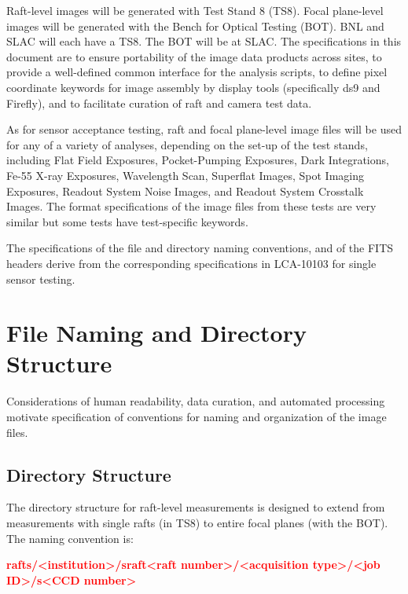 \documentclass{article}[12pt]
\newcommand{\red}{\textcolor{red}}
\begin{document}
Raft-level images will be generated with Test Stand 8 (TS8).  Focal plane-level images will be generated with the Bench for Optical Testing (BOT).  BNL and SLAC will each have a TS8.  The BOT will be at SLAC.  The specifications in this document are to ensure portability of the image data products across sites, to provide a well-defined common interface for the analysis scripts, to define pixel coordinate keywords for image assembly by display tools (specifically ds9 and Firefly), and to facilitate curation of raft and camera test data.

As for sensor acceptance testing, raft and focal plane-level image files will be used for any of a variety of analyses, depending on the set-up of the test stands, including Flat Field Exposures, Pocket-Pumping Exposures, Dark Integrations, Fe-55 X-ray Exposures, Wavelength Scan, Superflat Images, Spot Imaging Exposures, Readout System Noise Images, and Readout System Crosstalk Images.
The format specifications of the image files from these tests are very similar but some tests have test-specific keywords.  

The specifications of the file and directory naming conventions, and of the FITS headers derive from the corresponding specifications in LCA-10103 for single sensor testing.

\section{File Naming and Directory Structure}
Considerations of human readability, data curation, and automated processing motivate specification of conventions for naming and organization of the image files.

\subsection{Directory Structure}

The directory structure for raft-level measurements is designed to extend from measurements with single rafts (in TS8) to entire focal planes (with the BOT).  The naming convention is:

\red{{\bf rafts/<institution>/sraft<raft number>/<acquisition type>/<job ID>/s<CCD number>} }


\end{document}
